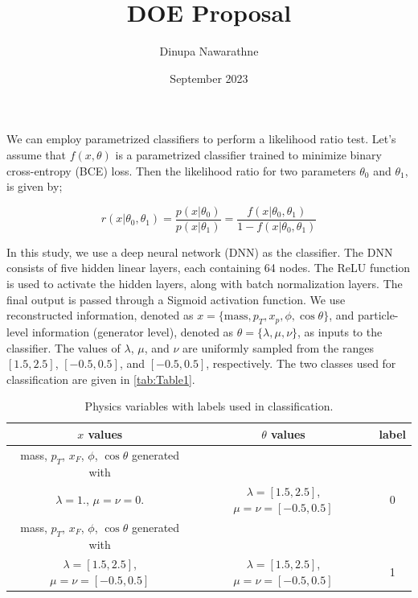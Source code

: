 \documentclass{article}
\title{DOE Proposal}
\author{Dinupa Nawarathne}
\date{September 2023}
\begin{document}
\maketitle

We can employ parametrized classifiers to perform a likelihood ratio test. Let's assume that $f(x, \theta)$ is a parametrized classifier trained to minimize binary cross-entropy (BCE) loss. Then the likelihood ratio for two parameters $\theta_{0}$ and $\theta_{1}$, is given by\cite{Rizvi:2023mws};

\begin{equation*}
	r(x| \theta_{0}, \theta_{1}) = \frac{p(x| \theta_{0})}{p(x| \theta_{1})} = \frac{f(x| \theta_{0}, \theta_{1})}{1 - f(x| \theta_{0}, \theta_{1})}
	\label{eq:Eq1}
\end{equation*}

In this study, we use a deep neural network (DNN) as the classifier. The DNN consists of five hidden linear layers, each containing 64 nodes. The ReLU function is used to activate the hidden layers, along with batch normalization layers. The final output is passed through a Sigmoid activation function. We use reconstructed information, denoted as $x = \{ \text{mass}, p_{T}, x_{p}, \phi, \cos\theta \}$, and particle-level information (generator level), denoted as $\theta = \{ \lambda, \mu, \nu \}$, as inputs to the classifier. The values of $\lambda$, $\mu$, and $\nu$ are uniformly sampled from the ranges $[1.5, 2.5]$, $[-0.5, 0.5]$, and $[-0.5, 0.5]$, respectively. The two classes used for classification are given in \autoref{tab:Table1}.

\begin{table}[H]
\begin{center}
\begin{tabular}{ |c|c|c| } 
 \hline
 $x$ values & $\theta$ values & label \\ 
 \hline
 mass, $p_{T}$, $x_{F}$, $\phi$, $\cos\theta$ generated with & & \\
 $\lambda = 1.$, $\mu = \nu = 0.$ & $\lambda = [1.5, 2.5]$, $\mu = \nu = [-0.5, 0.5]$ & 0 \\
\hline
mass, $p_{T}$, $x_{F}$, $\phi$, $\cos\theta$ generated with & &
\\ $\lambda = [1.5, 2.5]$, $\mu = \nu = [-0.5, 0.5]$ & $\lambda = [1.5, 2.5]$, $\mu = \nu = [-0.5, 0.5]$ & 1 \\ 
\hline
\end{tabular}
\caption{Physics variables with labels used in classification.}
\label{tab:Table1}
\end{center}
\end{table}
\end{document}
